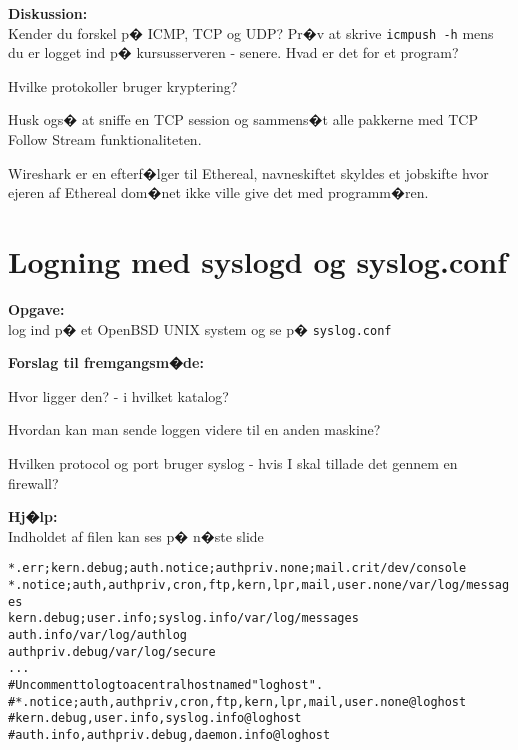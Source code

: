\documentclass[a4paper,11pt,notitlepage]{oevelser}
\begin{document}
{\bfseries Diskussion:}\\
Kender du forskel p� ICMP, TCP og UDP? Pr�v at skrive
\verb+icmpush -h+ mens du er logget ind p� kursusserveren -
senere. Hvad er det for et program?

Hvilke protokoller bruger kryptering?

Husk ogs� at sniffe en TCP session og sammens�t alle pakkerne med
TCP Follow Stream funktionaliteten.

Wireshark er en efterf�lger til Ethereal, navneskiftet skyldes et jobskifte hvor ejeren af Ethereal dom�net ikke ville give det med programm�ren.



\chapter{Logning med syslogd og syslog.conf}
\label{ex:syslogd-basic}

{\bfseries Opgave:}\\
log ind p� et OpenBSD UNIX system og se p� \verb+syslog.conf+

{\bfseries Forslag til fremgangsm�de:}\\
\begin{list2}
\item Hvor ligger den? - i hvilket katalog?
\item Hvordan kan man sende loggen videre til en anden maskine?
\item Hvilken protocol og port bruger syslog - hvis I skal tillade det
  gennem en firewall?
\end{list2}

{\bfseries Hj�lp:}\\
 Indholdet af filen kan ses p� n�ste slide

\begin{alltt}
\small
*.err;kern.debug;auth.notice;authpriv.none;mail.crit    /dev/console
*.notice;auth,authpriv,cron,ftp,kern,lpr,mail,user.none /var/log/messages
kern.debug;user.info;syslog.info                        /var/log/messages
auth.info                                               /var/log/authlog
authpriv.debug                                          /var/log/secure
...
# Uncomment to log to a central host named "loghost".
#*.notice;auth,authpriv,cron,ftp,kern,lpr,mail,user.none        @loghost
#kern.debug,user.info,syslog.info                               @loghost
#auth.info,authpriv.debug,daemon.info                           @loghost
\end{alltt}
\end{document}
